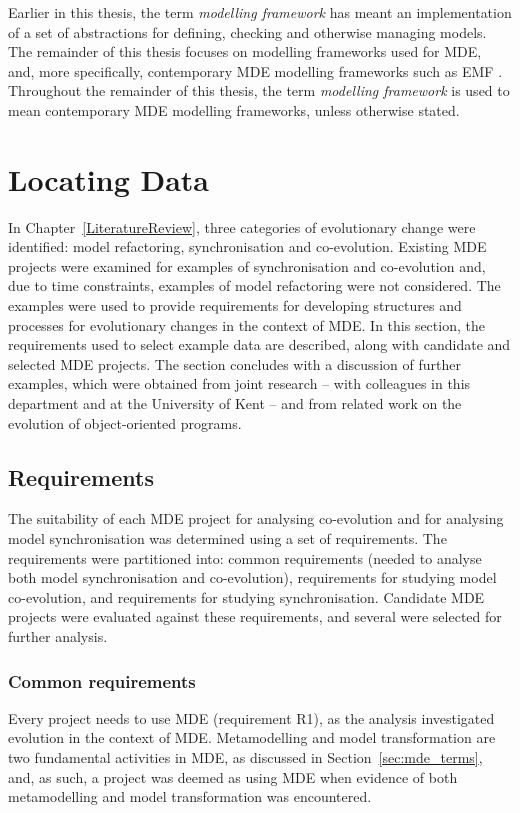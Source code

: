 Earlier in this thesis, the term \emph{modelling framework} has meant an implementation of a set of abstractions for defining, checking and otherwise managing models. The remainder of this thesis focuses on modelling frameworks used for MDE, and, more specifically, contemporary MDE modelling frameworks such as EMF \cite{steinberg09emf}. Throughout the remainder of this thesis, the term \emph{modelling framework} is used to mean contemporary MDE modelling frameworks, unless otherwise stated.


\section{Locating Data}
\label{sec:locating_data}
In Chapter~\ref{LiteratureReview}, three categories of evolutionary change were identified: model refactoring, synchronisation and co-evolution. Existing MDE projects were examined for examples of synchronisation and co-evolution and, due to time constraints, examples of model refactoring were not considered. The examples were used to provide requirements for developing structures and processes for evolutionary changes in the context of MDE. In this section, the requirements used to select example data are described, along with candidate and selected MDE projects. The section concludes with a discussion of further examples, which were obtained from joint research -- with colleagues in this department and at the University of Kent -- and from related work on the evolution of object-oriented programs.  

\subsection{Requirements}
The suitability of each MDE project for analysing co-evolution and for analysing model synchronisation was determined using a set of requirements. The requirements were partitioned into: common requirements (needed to analyse both model synchronisation and co-evolution), requirements for studying model co-evolution, and requirements for studying synchronisation. Candidate MDE projects were evaluated against these requirements, and several were selected for further analysis.

\subsubsection{Common requirements}
Every project needs to use MDE (requirement R1), as the analysis investigated evolution in the context of MDE. Metamodelling and model transformation are two fundamental activities in MDE, as discussed in Section~\ref{sec:mde_terms}, and, as such, a project was deemed as using MDE when evidence of both metamodelling and model transformation was encountered.

